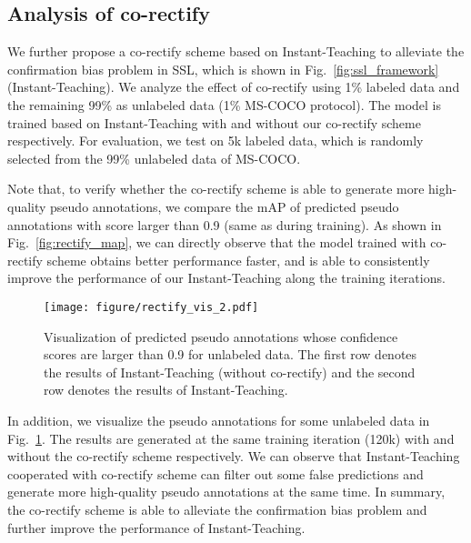 \documentclass[final]{cvpr}
\begin{document}
\subsection{Analysis of co-rectify}

We further propose a co-rectify scheme based on Instant-Teaching to alleviate the confirmation bias problem in SSL, which is shown in Fig.~\ref{fig:ssl_framework} (Instant-Teaching).
We analyze the effect of co-rectify using 1\% labeled data and the remaining 99\% as unlabeled data (1\% MS-COCO protocol). The model is trained based on Instant-Teaching with and without our co-rectify scheme respectively. For evaluation, we test on 5k labeled data, which is randomly selected from the 99\% unlabeled data of MS-COCO.

Note that, to verify whether the co-rectify scheme is able to generate more high-quality pseudo annotations, we compare the mAP of predicted pseudo annotations with score larger than 0.9 (same as  during training).
As shown in Fig.~\ref{fig:rectify_map}, we can directly observe that the model trained with co-rectify scheme obtains better performance faster, and is able to consistently improve the performance of our Instant-Teaching along the training iterations. 

\begin{figure}[t!]
	\begin{center}
	\texttt{[image: figure/rectify\_vis\_2.pdf]}
	\end{center}
	\vspace{-.1in}
	\caption{Visualization of predicted pseudo annotations whose confidence scores are larger than 0.9 for unlabeled data. The first row denotes the results of Instant-Teaching (without co-rectify) and the second row denotes the results of Instant-Teaching.}
	\label{fig:rectify_vis}
	\vspace{-.15in}
\end{figure}


In addition, we visualize the pseudo annotations for some unlabeled data in Fig.~\ref{fig:rectify_vis}. The results are generated at the same training iteration (120k) with and without the co-rectify scheme respectively. We can observe that Instant-Teaching cooperated with co-rectify scheme can filter out some false predictions and generate more high-quality pseudo annotations at the same time. In summary, the co-rectify scheme is able to alleviate the confirmation bias problem and further improve the performance of Instant-Teaching.
\end{document}
